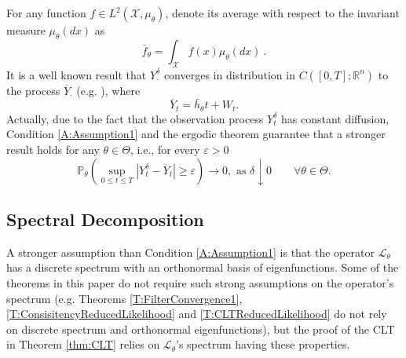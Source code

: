 \documentclass{article}
\begin{document}
For any function $f\in L^2(\mathcal{X},\mu_{\theta})$, denote its average with respect to the invariant measure $\mu_{\theta}(dx)$ as
\[
\bar f_\theta= \int_{\mathcal X}f(x)\mu_\theta(dx)\ .
\]
It is a well known result that $Y^{\delta}_{\cdot}$ converges in distribution in $C([0,T];\mathbb{R}^n)$ to the process $\overline{Y}_{\cdot}$
 (e.g. \cite{BLP,PardouxVeretennikov2}), where
\begin{equation}
\overline{Y}_{t}=\bar{h}_{\theta} t+ W_{t}.\label{Eq:LimitingModel}
\end{equation}
Actually, due to the fact that the observation process $Y^{\delta}_{t}$ has constant diffusion, Condition \ref{A:Assumption1} and the ergodic theorem guarantee that a stronger result holds for any $\theta\in\Theta$, i.e., for every $\varepsilon>0$
\begin{equation}
\mathbb{P}_\theta\left(\sup_{0\leq t\leq T}\left|Y^{\delta}_{t}-\overline{Y}_{t}\right|\geq \varepsilon \right)\rightarrow 0, \textrm{ as }\delta\downarrow 0\qquad\forall\theta\in\Theta.\label{Eq:MeanSquareConvergence}
\end{equation}


\subsection{Spectral Decomposition}\label{SS:SpectralDecomposition}
A stronger assumption than Condition \ref{A:Assumption1} is that the operator $\mathcal L_\theta$ has a discrete spectrum with an orthonormal basis of eigenfunctions. Some of the theorems in this paper do not require such strong assumptions on the operator's spectrum (e.g. Theorems \ref{T:FilterConvergence1}, \ref{T:ConsisitencyReducedLikelihood} and \ref{T:CLTReducedLikelihood} do not rely on discrete spectrum and orthonormal eigenfunctions), but the proof of the CLT in Theorem \ref{thm:CLT} relies on $\mathcal L_\theta$'s spectrum having these properties.
\end{document}
